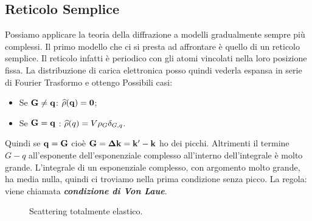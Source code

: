 \documentclass[a4paper,12pt]{article}
\begin{document}
\subsection{Reticolo Semplice}
Possiamo applicare la teoria della diffrazione a modelli gradualmente sempre più complessi. Il primo modello che ci si presta ad affrontare è quello di un reticolo semplice. Il reticolo infatti è periodico con gli atomi vincolati nella loro posizione fissa. La distribuzione di carica elettronica posso quindi vederla espansa in serie di Fourier
Trasformo e ottengo 
Possibili casi:
\begin{itemize}
	\item Se $\it\bf{G} \neq \it\bf{q}$: $\op{\rho} (\vet{q}) =0$;
	\item Se $\it\bf{G} = \it\bf{q}$ : $\op{\rho} (q) = V\rho_{G } \delta_{G ,q}$.
\end{itemize}
Quindi se $\it\bf{q}  = \it\bf{G} $ cioè $\it\bf{G} = \it\bf{\Delta k} = \it\bf{k'} - \it\bf{k}$ ho dei picchi. Altrimenti il termine $G-q$ all'esponente dell'esponenziale complesso all'interno dell'integrale è molto grande. L'integrale di un esponenziale complesso, con argomento molto grande, ha media nulla, quindi ci troviamo nella prima condizione senza picco. La regola:
viene chiamata \textbf{\textit{condizione di Von Laue}}. 
\begin{figure}
	\centering
	\caption{Scattering totalmente elastico.}
	\label{bragg}
\end{figure}
\end{document}
